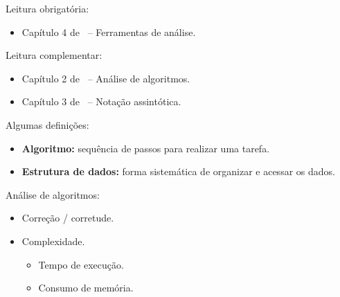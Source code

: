 \newcommand{\templatesdir}{../../../templates}
\newcommand{\template}{template-roteiro-est}


\newcommand{\content}{Complexidade de algoritmos}
\newcommand{\class}{Algoritmos e Estruturas de Dados}
\newcommand{\shortcourse}{45EST}



\makeheader

{
Leitura obrigatória:
\begin{itemize}
	\item Capítulo 4 de~\cite{GoodrichAndTamassia2013} -- Ferramentas de análise.
\end{itemize}

Leitura complementar:
\begin{itemize}
	\item Capítulo 2 de~\cite{Preiss2001} -- Análise de algoritmos.
	\item Capítulo 3 de~\cite{Preiss2001} -- Notação assintótica.
\end{itemize}
}

\medskip


Algumas definições:
\begin{itemize}
	\item \textbf{Algoritmo:} sequência de passos para realizar uma tarefa.
	\item \textbf{Estrutura de dados:} forma sistemática de organizar e acessar os dados.
\end{itemize}


Análise de algoritmos:
\begin{itemize}
	\item Correção / corretude.
	\item Complexidade.
	\begin{itemize}
		\item Tempo de execução.
		\item Consumo de memória.
	\end{itemize}
\end{itemize}

\medskip

%

